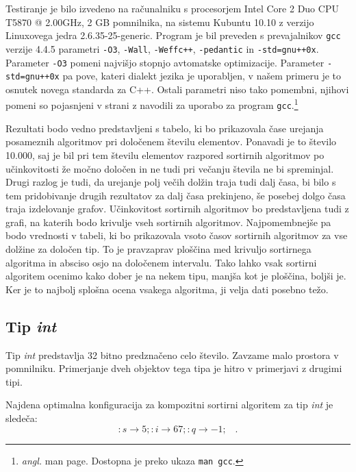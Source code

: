 \documentclass[a4paper,oneside,12pt]{article}
\newcommand{\lra}{\ensuremath{\longrightarrow}}
\newcommand{\edot}{\;\;\;.}
\begin{document}
Testiranje je bilo izvedeno na računalniku s procesorjem Intel\textregistered{} Core\texttrademark{}
2 Duo CPU T5870 @ 2.00GHz, 2 GB pomnilnika, na sistemu Kubuntu 10.10 z verzijo Linuxovega jedra 2.6.35-25-generic.
Program je bil preveden s prevajalnikov \texttt{gcc} verzije 4.4.5 parametri \texttt{-O3},
\texttt{-Wall}, \texttt{-Weffc++}, \texttt{-pedantic} in \texttt{-std=gnu++0x}.
Parameter \texttt{-O3} pomeni najvišjo stopnjo avtomatske optimizacije. Parameter \texttt{-std=gnu++0x} 
pa pove, kateri dialekt jezika je uporabljen, v našem primeru je to osnutek novega standarda za C++.
Ostali parametri niso tako pomembni, njihovi pomeni so pojasnjeni v strani z navodili za uporabo za program 
\texttt{gcc}.\footnote{\emph{angl.} man page. Dostopna je preko ukaza \texttt{man gcc}.}

Rezultati bodo vedno predstavljeni s tabelo, ki bo prikazovala čase urejanja
posameznih algoritmov pri določenem številu elementov. Ponavadi je to število
10.000, saj je bil pri tem številu elementov razpored sortirnih algoritmov po
učinkovitosti že močno določen in ne tudi pri večanju števila ne bi spreminjal.
Drugi razlog je tudi, da urejanje polj večih dolžin traja tudi dalj časa, bi
bilo s tem pridobivanje drugih rezultatov za dalj časa prekinjeno, še posebej
dolgo časa traja izdelovanje grafov.
Učinkovitost sortirnih algoritmov bo predstavljena tudi z 
grafi, na katerih bodo krivulje vseh sortirnih algoritmov. Najpomembnejše pa
bodo vrednosti v tabeli, ki bo prikazovala vsoto časov sortirnih algoritmov za
vse dolžine za določen tip. To je pravzaprav ploščina med krivuljo sortirnega
algoritma in absciso osjo na določenem intervalu. Tako lahko vsak sortirni
algoritem ocenimo kako dober je na nekem tipu, manjša kot je ploščina, boljši
je. Ker je to najbolj splošna ocena vsakega algoritma, ji velja dati posebno
težo.
\pagebreak

\subsection{Tip \emph{int}}
\label{chapter:rez:int}
Tip \emph{int} predstavlja 32 bitno predznačeno celo število. Zavzame malo prostora v 
pomnilniku. Primerjanje dveh objektov tega tipa je hitro v primerjavi z drugimi tipi.

Najdena optimalna konfiguracija za kompozitni sortirni algoritem za tip \emph{int} je sledeča:
\[ :s \lra 5;:i \lra 67;:q \lra -1; \edot \]
\end{document}
